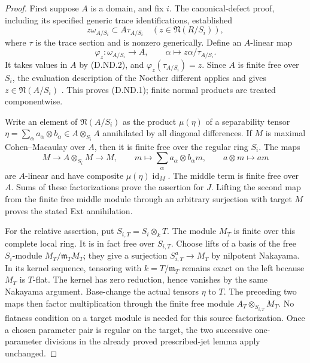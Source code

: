 \begin{proof}
First suppose $A$ is a domain, and fix $i$. The canonical-defect proof,
including its specified generic trace identifications, established
\[
 z\omega_{A/S_i}\subset A\tau_{A/S_i}
 \quad(z\in\mathfrak N(R/S_i)),                        \tag{D.ND.2}
\]
where $\tau$ is the trace section and is nonzero generically.
Define an $A$-linear map
\[
 \varphi_z:\omega_{A/S_i}\longrightarrow A,
 \qquad \alpha\longmapsto z\alpha/\tau_{A/S_i}.
\]
It takes values in $A$ by (D.ND.2), and
$\varphi_z(\tau_{A/S_i})=z$. Since $A$ is finite free over $S_i$,
the evaluation description of the Noether different applies and gives
$z\in\mathfrak N(A/S_i)$
\citep[Tag 0BVT, Lemma 49.6.7 and its complete proof]
{C_StacksCanonicalDefect}. This proves (D.ND.1); finite normal products
are treated componentwise.

Write an element of $\mathfrak N(A/S_i)$ as the product
$\mu(\eta)$ of a separability tensor
$\eta=\sum_\alpha a_\alpha\otimes b_\alpha\in A\otimes_{S_i}A$
annihilated by all diagonal differences. If $M$ is maximal
Cohen--Macaulay over $A$, then it is finite free over the regular ring
$S_i$. The maps
\[
 M\longrightarrow A\otimes_{S_i}M\longrightarrow M,
 \qquad m\longmapsto\sum_\alpha a_\alpha\otimes b_\alpha m,
 \qquad a\otimes m\longmapsto am
\]
are $A$-linear and have composite $\mu(\eta)\operatorname{id}_M$.
The middle term is finite free over $A$. Sums of these factorizations
prove the assertion for $J$. Lifting the second map from the finite free
middle module through an arbitrary surjection with target $M$ proves the
stated Ext annihilation.

For the relative assertion, put $S_{i,T}=S_i\otimes_kT$. The module
$M_T$ is finite over this complete local ring. It is in fact free over
$S_{i,T}$. Choose lifts of a basis of the free $S_i$-module $M_T/\mathfrak m_T M_T$;
they give a surjection $S_{i,T}^a\to M_T$ by nilpotent Nakayama. In its
kernel sequence, tensoring with $k=T/\mathfrak m_T$ remains exact on
the left because $M_T$ is $T$-flat. The kernel has zero reduction, hence
vanishes by the same Nakayama argument. Base-change the actual tensors
$\eta$ to $T$. The preceding two maps then factor multiplication through
the finite free module $A_T\otimes_{S_{i,T}}M_T$.
No flatness condition on a target module is needed for this source
factorization. Once a chosen parameter pair is regular on the target,
the two successive one-parameter divisions in the already proved
prescribed-jet lemma apply unchanged.
\end{proof}

